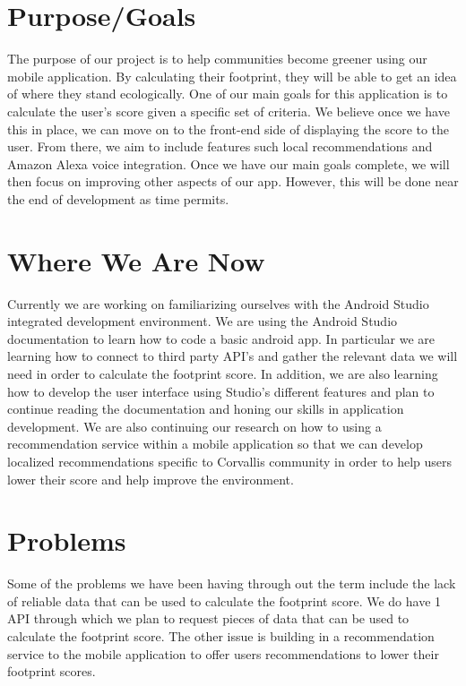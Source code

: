 \documentclass[onecolumn, draftclsnofoot,10pt, compsoc, tikz]{IEEEtran}
\begin{document}
\section{Purpose/Goals}
The purpose of our project is to help communities become greener using our mobile application. By calculating their footprint, they will be able to get an idea of where they stand ecologically. One of our main goals for this application is to calculate the user's score given a specific set of criteria. We believe once we have this in place, we can move on to the front-end side of displaying the score to the user. From there, we aim to include features such local recommendations and Amazon Alexa voice integration. Once we have our main goals complete, we will then focus on improving other aspects of our app. However, this will be done near the end of development as time permits.


\section{Where We Are Now}
Currently we are working on familiarizing ourselves with the Android Studio integrated development environment. We are using the Android Studio documentation to learn how to code a basic android app. In particular we are learning how to connect to third party API's and gather the relevant data we will need in order to calculate the footprint score. In addition, we are also learning how to develop the user interface using Studio's different features and plan to continue reading the documentation and honing our skills in application development. We are also continuing our research on how to using a recommendation service within a mobile application so that we can develop localized recommendations specific to Corvallis community in order to help users lower their score and help improve the environment. 


\section{Problems}
Some of the problems we have been having through out the term include the lack of reliable data that can be used to calculate the footprint score. We do have 1 API through which we plan to request pieces of data that can be used to calculate the footprint score. The other issue is building in a recommendation service to the mobile application to offer users recommendations to lower their footprint scores.  


\clearpage
\end{document}
